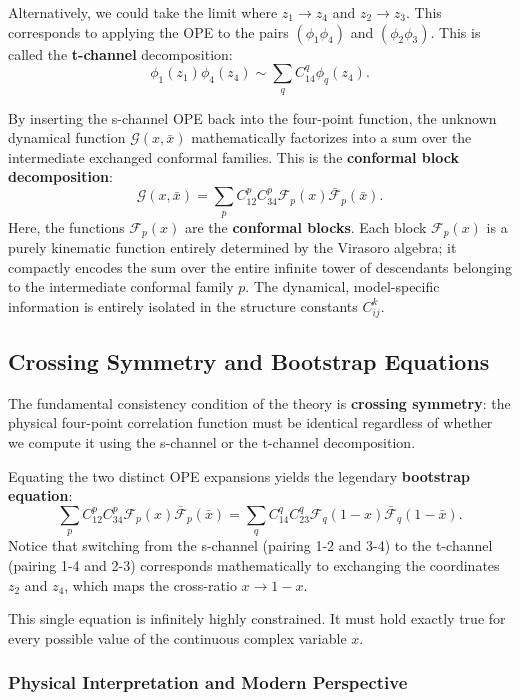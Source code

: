 Alternatively, we could take the limit where $z_1 \to z_4$ and $z_2 \to z_3$. This corresponds to applying the OPE to the pairs $(\phi_1 \phi_4)$ and $(\phi_2 \phi_3)$. This is called the \textbf{t-channel} decomposition:
\[
    \phi_1(z_1)\phi_4(z_4) \sim \sum_q C_{14}^q \phi_q(z_4).
\]

By inserting the s-channel OPE back into the four-point function, the unknown dynamical function $\mathcal{G}(x, \bar{x})$ mathematically factorizes into a sum over the intermediate exchanged conformal families. This is the \textbf{conformal block decomposition}:
\[
    \mathcal{G}(x, \bar{x}) = \sum_p C_{12}^p C_{34}^p \mathcal{F}_p(x) \bar{\mathcal{F}}_p(\bar{x}).
\]
Here, the functions $\mathcal{F}_p(x)$ are the \textbf{conformal blocks}. Each block $\mathcal{F}_p(x)$ is a purely kinematic function entirely determined by the Virasoro algebra; it compactly encodes the sum over the entire infinite tower of descendants belonging to the intermediate conformal family $p$. The dynamical, model-specific information is entirely isolated in the structure constants $C_{ij}^k$.

\subsection{Crossing Symmetry and Bootstrap Equations}

The fundamental consistency condition of the theory is \textbf{crossing symmetry}: the physical four-point correlation function must be identical regardless of whether we compute it using the s-channel or the t-channel decomposition.

Equating the two distinct OPE expansions yields the legendary \textbf{bootstrap equation}:
\[
    \sum_p C_{12}^p C_{34}^p \mathcal{F}_p(x) \bar{\mathcal{F}}_p(\bar{x}) = \sum_q C_{14}^q C_{23}^q \mathcal{F}_q(1-x) \bar{\mathcal{F}}_q(1-\bar{x}).
\]
Notice that switching from the s-channel (pairing 1-2 and 3-4) to the t-channel (pairing 1-4 and 2-3) corresponds mathematically to exchanging the coordinates $z_2$ and $z_4$, which maps the cross-ratio $x \to 1-x$.

This single equation is infinitely highly constrained. It must hold exactly true for every possible value of the continuous complex variable $x$.

\subsubsection{Physical Interpretation and Modern Perspective}

